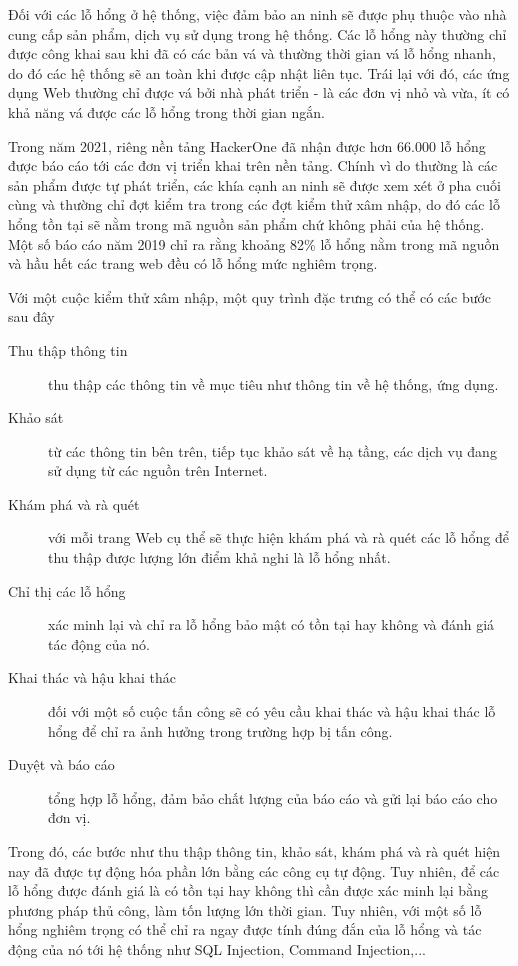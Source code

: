 \documentclass[./../main.tex]{subfiles}
\begin{document}
Đối với các lỗ hổng ở hệ thống, việc đảm bảo an ninh sẽ được phụ thuộc vào nhà cung cấp sản phẩm, dịch vụ sử dụng trong hệ thống.
Các lỗ hổng này thường chỉ được công khai sau khi đã có các bản vá và thường thời gian vá lỗ hổng nhanh, do đó các hệ thống sẽ an toàn khi được cập nhật liên tục. Trái lại với đó, các ứng dụng Web thường chỉ được vá bởi nhà phát triển - là các đơn vị nhỏ và vừa, ít có khả năng vá được các lỗ hổng trong thời gian ngắn.

Trong năm 2021, riêng nền tảng HackerOne đã nhận được hơn 66.000 lỗ hổng được báo cáo tới các đơn vị triển khai trên nền tảng.
Chính vì do thường là các sản phẩm được tự phát triển, các khía cạnh an ninh sẽ được xem xét ở pha cuối cùng và thường chỉ đợt kiểm tra trong các đợt kiểm thử xâm nhập, do đó các lỗ hổng tồn tại sẽ nằm trong mã nguồn sản phẩm chứ không phải của hệ thống. Một số báo cáo năm 2019 chỉ ra rằng khoảng 82\% lỗ hổng nằm trong mã nguồn và hầu hết các trang web đều có lỗ hổng mức nghiêm trọng.

Với một cuộc kiểm thử xâm nhập, một quy trình đặc trưng có thể có các bước sau đây
\begin{description}
	\item [Thu thập thông tin] thu thập các thông tin về mục tiêu như thông tin về hệ thống, ứng dụng.
	\item [Khảo sát] từ các thông tin bên trên, tiếp tục khảo sát về hạ tầng, các dịch vụ đang sử dụng từ các nguồn trên Internet.
	\item [Khám phá và rà quét] với mỗi trang Web cụ thể sẽ thực hiện khám phá và rà quét các lỗ hổng để thu thập được lượng lớn điểm khả nghi là lỗ hổng nhất.
	\item [Chỉ thị các lỗ hổng] xác minh lại và chỉ ra lỗ hổng bảo mật có tồn tại hay không và đánh giá tác động của nó.
	\item [Khai thác và hậu khai thác] đối với một số cuộc tấn công sẽ có yêu cầu khai thác và hậu khai thác lỗ hổng để chỉ ra ảnh hưởng trong trường hợp bị tấn công.
	\item [Duyệt và báo cáo] tổng hợp lỗ hổng, đảm bảo chất lượng của báo cáo và gửi lại báo cáo cho đơn vị.
\end{description}
Trong đó, các bước như thu thập thông tin, khảo sát, khám phá và rà quét hiện nay đã được tự động hóa phần lớn bằng các công cụ tự động. Tuy nhiên, để các lỗ hổng được đánh giá là có tồn tại hay không thì cần được xác minh lại bằng phương pháp thủ công, làm tốn lượng lớn thời gian. Tuy nhiên, với một số lỗ hổng nghiêm trọng có thể chỉ ra ngay được tính đúng đắn của lỗ hổng và tác động của nó tới hệ thống như SQL Injection, Command Injection,...
\end{document}
